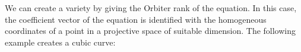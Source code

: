 \bigskip



We can create a variety by giving the Orbiter rank of the equation. 
In this case, the coefficient vector of the equation is identified with the homogeneous coordinates of a point in a projective space of suitable dimension. The following example creates a cubic curve:







\bigskip

